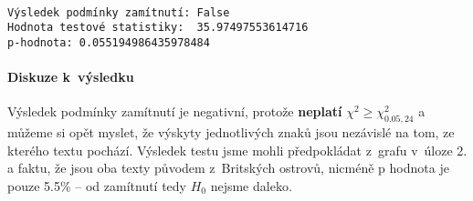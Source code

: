 \documentclass[11pt]{article}
\begin{document}
    \begin{Verbatim}[commandchars=\\\{\}]

Výsledek podmínky zamítnutí: False
Hodnota testové statistiky:  35.97497553614716
p-hodnota: 0.055194986435978484

    \end{Verbatim}

    \paragraph{Diskuze k~výsledku}\label{diskuze-k-vuxfdsledku}
    
Výsledek podmínky zamítnutí je negativní, protože \textbf{neplatí} \(\chi^{2} \geq \chi_{0.05,24}^{2}\) a můžeme si opět myslet, že
výskyty jednotlivých znaků jsou nezávislé na tom, ze kterého textu pochází.
Výsledek testu jsme mohli předpokládat z~grafu v~úloze 2. a faktu, že
jsou oba texty původem z~Britských ostrovů, nicméně p hodnota je pouze
5.5\% -- od zamítnutí tedy \(H_0\) nejsme daleko.
\end{document}
